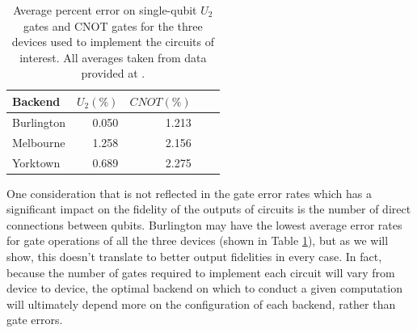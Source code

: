 \begin{table} \centering
	\begin{tabular}{lrrrr} \toprule Backend & $U_2 (\%)$ & $CNOT (\%)$ \\ \midrule
		Burlington & 0.050 & 1.213 \\ Melbourne & 1.258 & 2.156 \\ Yorktown & 0.689 &
		2.275 \\ \bottomrule
	\end{tabular}
	\caption{Average percent error on single-qubit $U_2$ gates and CNOT gates for
		the three devices used to implement the circuits of interest. All averages taken
		from data provided at \cite{ibmq_burlington,ibmq_16_melbourne,ibmq_yorktown}.}
	\label{tb:average_errors}
\end{table}
One consideration that is not reflected in the gate error rates which has a
significant impact on the fidelity of the outputs of circuits is the number of
direct connections between qubits. Burlington may have the lowest average error
rates for gate operations of all the three devices (shown in Table
\ref{tb:average_errors}), but as we will show, this doesn't translate to better
output fidelities in every case. In fact, because the number of gates required
to implement each circuit will vary from device to device, the optimal backend
on which to conduct a given computation will ultimately depend more on the
configuration of each backend, rather than gate errors.

